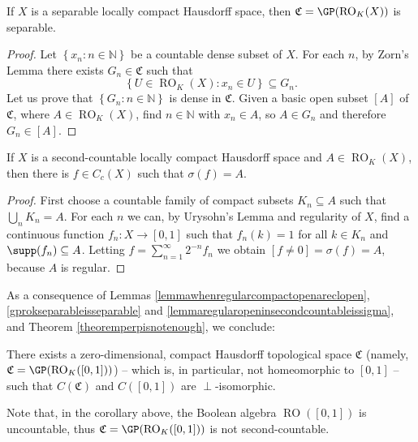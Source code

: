 \begin{lemma}\label{gprokseparableisseparable}
If $X$ is a separable locally compact Hausdorff space, then $\mathfrak{C}=\GP(\operatorname{RO}_K(X))$ is separable.
\end{lemma}
\begin{proof}
Let $\left\{x_n:n\in\mathbb{N}\right\}$ be a countable dense subset of $X$. For each $n$, by Zorn's Lemma there exists $G_n\in\mathfrak{C}$ such that
\[\left\{U\in\operatorname{RO}_K(X):x_n\in U\right\}\subseteq G_n.\]
Let us prove that $\left\{G_n:n\in\mathbb{N}\right\}$ is dense in $\mathfrak{C}$. Given a basic open subset $[A]$ of $\mathfrak{C}$, where $A\in\operatorname{RO}_K(X)$, find $n\in\mathbb{N}$ with $x_n\in A$, so $A\in G_n$ and therefore $G_n\in[A]$.\qedhere
\end{proof}

\begin{lemma}\label{lemmaregularopeninsecondcountableissigma}
If $X$ is a second-countable locally compact Hausdorff space and $A\in\operatorname{RO}_K(X)$, then there is $f\in C_c(X)$ such that $\sigma(f)=A$.
\end{lemma}
\begin{proof}
First choose a countable family of compact subsets $K_n\subseteq A$ such that $\bigcup_nK_n=A$. For each $n$ we can, by Urysohn's Lemma and regularity of $X$, find a continuous function $f_n:X\to[0,1]$ such that $f_n(k)=1$ for all $k\in K_n$ and $\supp(f_n)\subseteq A$. Letting $f=\sum_{n=1}^\infty 2^{-n}f_n$ we obtain $[f\neq 0]=\sigma(f)=A$, because $A$ is regular.\qedhere
\end{proof}

As a consequence of Lemmas \ref{lemmawhenregularcompactopenareclopen}, \ref{gprokseparableisseparable} and \ref{lemmaregularopeninsecondcountableissigma}, and Theorem \ref{theoremperpisnotenough}, we conclude:

\begin{corollary}\label{corollary01stoneperp}
	There exists a  zero-dimensional, compact Hausdorff topological space $\mathfrak{C}$ (name\-ly, $\mathfrak{C}=\GP(\operatorname{RO}_K([0,1]))$) -- which is, in particular, not homeomorphic to $[0,1]$ -- such that $C(\mathfrak{C})$ and $C([0,1])$ are $\perp$-isomorphic.
\end{corollary}

Note that, in the corollary above, the Boolean algebra $\operatorname{RO}([0,1])$ is uncountable, thus $\mathfrak{C}=\GP(\operatorname{RO}_K([0,1]))$ is not second-countable.

